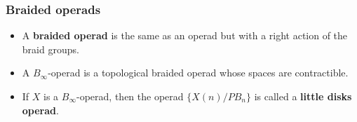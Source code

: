 \documentclass{beamer}
\theoremstyle{definition}
\newtheorem{prop}[teorema]{Proposition}
\begin{document}
 \begin{frame}
 	\frametitle{Braided operads}
 	\begin{itemize}
 		\item<1-> A \textbf{braided operad} is the same as an operad but with a right action of the braid groups. 
 		\item<2-> A $B_\infty$-operad is a topological braided operad whose spaces are contractible.
 		\item<3-> If $X$ is a $B_\infty$-operad, then the operad $\{X(n)/PB_n\}$ is called a \textbf{little disks operad}.
 	\end{itemize}
 
 
\end{frame}
\end{document}
